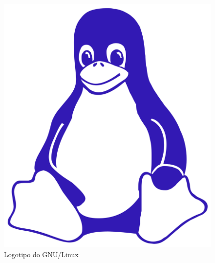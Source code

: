 \begin{figure}[H]
  \centering
  \includegraphics[scale=0.15]{Figures/0. General/linux_penguin.png}
  \caption{Logotipo do GNU/Linux}
  \label{fig: style 1 imagem de teste}
\end{figure}